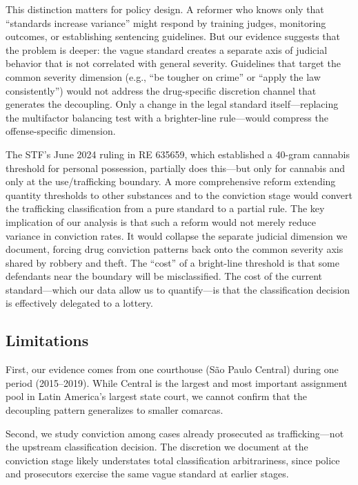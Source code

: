 \documentclass[12pt]{article}
\begin{document}
This distinction matters for policy design. A reformer who knows only that ``standards increase variance'' might respond by training judges, monitoring outcomes, or establishing sentencing guidelines. But our evidence suggests that the problem is deeper: the vague standard creates a separate axis of judicial behavior that is not correlated with general severity. Guidelines that target the common severity dimension (e.g., ``be tougher on crime'' or ``apply the law consistently'') would not address the drug-specific discretion channel that generates the decoupling. Only a change in the legal standard itself---replacing the multifactor balancing test with a brighter-line rule---would compress the offense-specific dimension.

The STF's June 2024 ruling in RE 635659, which established a 40-gram cannabis threshold for personal possession, partially does this---but only for cannabis and only at the use/trafficking boundary. A more comprehensive reform extending quantity thresholds to other substances and to the conviction stage would convert the trafficking classification from a pure standard to a partial rule. The key implication of our analysis is that such a reform would not merely reduce variance in conviction rates. It would collapse the separate judicial dimension we document, forcing drug conviction patterns back onto the common severity axis shared by robbery and theft. The ``cost'' of a bright-line threshold is that some defendants near the boundary will be misclassified. The cost of the current standard---which our data allow us to quantify---is that the classification decision is effectively delegated to a lottery.

\subsection{Limitations}

First, our evidence comes from one courthouse (S\~ao Paulo Central) during one period (2015--2019). While Central is the largest and most important assignment pool in Latin America's largest state court, we cannot confirm that the decoupling pattern generalizes to smaller comarcas.

Second, we study conviction among cases already prosecuted as trafficking---not the upstream classification decision. The discretion we document at the conviction stage likely understates total classification arbitrariness, since police and prosecutors exercise the same vague standard at earlier stages.
\end{document}
